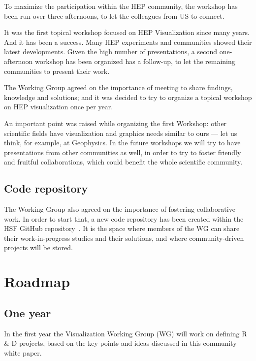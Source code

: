 \documentclass[12pt,a4paper]{article}
\begin{document}
To maximize the participation within the HEP community, the workshop has been run over three afternoons, to let the
colleagues from US to connect.

It was the first topical workshop focused on HEP Visualization since many years. And it has been a success. Many HEP
experiments and communities showed their latest developments. Given the high number of presentations, a second one-afternoon
workshop has been organized has a follow-up, to let the remaining communities to present their work.

The Working Group agreed on the importance of meeting to share findings, knowledge and solutions; and it was decided to
try to organize a topical workshop on HEP visualization once per year.

An important point was raised while organizing the first Workshop: other scientific fields have visualization and
graphics needs similar to ours --- let us think, for example, at Geophysics. In the future workshops we will try to
have presentations from other communities as well, in order to try to foster friendly and fruitful collaborations,
which could benefit the whole scientific community.

\hypertarget{repo}{%
\subsection{Code repository}\label{repo}}

The Working Group also agreed on the importance of fostering collaborative work.
In order to start that, a new code repository has been created within the HSF GitHub repository~\cite{HSFVizRepo}.
It is the space where members of the WG can share their work-in-progress studies and their solutions, and where
community-driven projects will be stored.

\hypertarget{roadmap}{%
\section{Roadmap}\label{roadmap}}

\hypertarget{one-year}{%
\subsection{One year}\label{one-year}}

In the first year the Visualization Working Group (WG) will work on defining R \& D projects, based on the key
points and ideas discussed in this community white paper.
\end{document}
